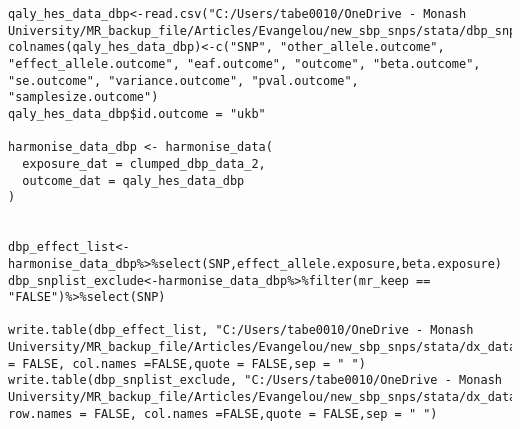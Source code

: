 \documentclass[11pt]{article}
\newcounter{subsubsubsection}[subsubsection]
\begin{document}
\begin{lstlisting}[style=Rstyle]
qaly_hes_data_dbp<-read.csv("C:/Users/tabe0010/OneDrive - Monash University/MR_backup_file/Articles/Evangelou/new_sbp_snps/stata/dbp_snps/snp_qaly_hes_dbp.csv")
colnames(qaly_hes_data_dbp)<-c("SNP", "other_allele.outcome", "effect_allele.outcome", "eaf.outcome", "outcome", "beta.outcome", "se.outcome", "variance.outcome", "pval.outcome", "samplesize.outcome")
qaly_hes_data_dbp$id.outcome = "ukb"

harmonise_data_dbp <- harmonise_data(
  exposure_dat = clumped_dbp_data_2, 
  outcome_dat = qaly_hes_data_dbp
)


dbp_effect_list<-harmonise_data_dbp%>%select(SNP,effect_allele.exposure,beta.exposure)
dbp_snplist_exclude<-harmonise_data_dbp%>%filter(mr_keep == "FALSE")%>%select(SNP)

write.table(dbp_effect_list, "C:/Users/tabe0010/OneDrive - Monash University/MR_backup_file/Articles/Evangelou/new_sbp_snps/stata/dx_data/dbp/data/dbp_effect_list.txt",row.names = FALSE, col.names =FALSE,quote = FALSE,sep = " ")
write.table(dbp_snplist_exclude, "C:/Users/tabe0010/OneDrive - Monash University/MR_backup_file/Articles/Evangelou/new_sbp_snps/stata/dx_data/dbp/data/dbp_snplist_exclude.txt", row.names = FALSE, col.names =FALSE,quote = FALSE,sep = " ")

\end{lstlisting}
\color{black}
\end{document}
